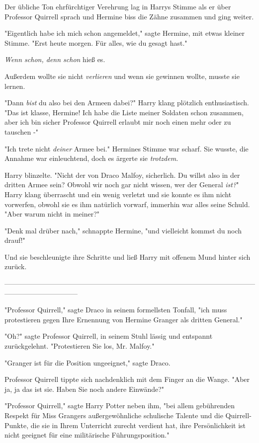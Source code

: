 {Der übliche Ton ehrfürchtiger Verehrung lag in Harrys Stimme als er über Professor Quirrell sprach und Hermine biss die Zähne zusammen und ging weiter.

"Eigentlich habe ich mich schon angemeldet," sagte Hermine, mit etwas kleiner Stimme. "Erst heute morgen. Für alles, wie du gesagt hast."

\emph{Wenn schon, denn schon} hieß es.

Außerdem wollte sie nicht \emph{verlieren} und wenn sie gewinnen wollte, musste sie lernen.

"Dann \emph{bist} du also bei den Armeen dabei?" Harry klang plötzlich enthusiastisch. "Das ist klasse, Hermine! Ich habe die Liste meiner Soldaten schon zusammen, aber ich bin sicher Professor Quirrell erlaubt mir noch einen mehr oder zu tauschen -"

"Ich trete nicht \emph{deiner} Armee bei." Hermines Stimme war scharf. Sie wusste, die Annahme war einleuchtend, doch es ärgerte sie \emph{trotzdem.}

Harry blinzelte. "Nicht der von Draco Malfoy, sicherlich. Du willst also in der dritten Armee sein? Obwohl wir noch gar nicht wissen, wer der General \emph{ist?}" Harry klang überrascht und ein wenig verletzt und sie konnte es ihm nicht vorwerfen, obwohl sie es ihm natürlich vorwarf, immerhin war alles seine Schuld. "Aber warum nicht in meiner?"

"Denk mal drüber nach," schnappte Hermine, "und vielleicht kommst du noch drauf!"

Und sie beschleunigte ihre Schritte und ließ Harry mit offenem Mund hinter sich zurück.

--------------------------------------------------------------------------------------------------------------------------------------------

"Professor Quirrell," sagte Draco in seinem formellsten Tonfall, "ich muss protestieren gegen Ihre Ernennung von Hermine Granger als dritten General."

"Oh?" sagte Professor Quirrell, in seinem Stuhl lässig und entspannt zurückgelehnt. "Protestieren Sie los, Mr. Malfoy."

"Granger ist für die Position ungeeignet," sagte Draco.

Professor Quirrell tippte sich nachdenklich mit dem Finger an die Wange. "Aber ja, ja das ist sie. Haben Sie noch andere Einwände?"

"Professor Quirrell," sagte Harry Potter neben ihm, "bei allem gebührenden Respekt für Miss Grangers außergewöhnliche schulische Talente und die Quirrell-Punkte, die sie in Ihrem Unterricht zurecht verdient hat, ihre Persönlichkeit ist nicht geeignet für eine militärische Führungsposition."

}
